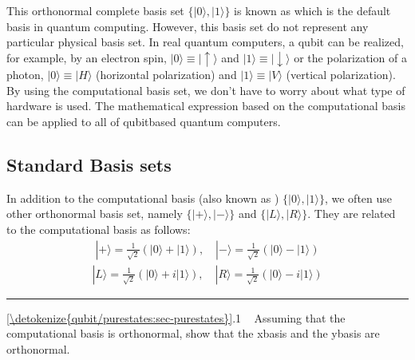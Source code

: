 \documentclass[letterpaper,10pt,english]{jupyterBook}
\begin{document}
\sphinxAtStartPar
This orthonormal complete basis set \(\{|0\rangle, |1\rangle\}\) is known as  which is the default basis in quantum computing.  However, this basis set do not represent any particular physical basis set.  In real quantum computers,  a qubit can be realized, for example, by an electron spin, \(|0\rangle \equiv | \uparrow \rangle\) and \(|1\rangle \equiv |\downarrow \rangle\) or the polarization of a photon, \(|0\rangle \equiv | H \rangle\) (horizontal polarization) and \(|1\rangle \equiv | V \rangle\) (vertical polarization).  By using the computational basis set, we don’t have to worry about what type of hardware is used.  The mathematical expression based on the computational basis can be applied to all of qubit\sphinxhyphen{}based quantum computers.


\subsection{Standard Basis sets}
\label{\detokenize{qubit/purestates:standard-basis-sets}}
\sphinxAtStartPar
In addition to the computational basis (also known as ) \(\{|0\rangle,|1\rangle\}\), we often use other orthonormal basis set, namely  \(\{|+\rangle, |-\rangle\}\) and  \(\{|L\rangle,|R\rangle\}\).
They are related to the computational basis as follows:
\begin{equation}\label{equation:qubit/purestates:XBasis}
\begin{split}
|+\rangle = \frac{1}{\sqrt{2}}\left(|0\rangle + |1\rangle\right), \quad
|-\rangle = \frac{1}{\sqrt{2}}\left(|0\rangle - |1\rangle\right)
\end{split}
\end{equation}\begin{equation}\label{equation:qubit/purestates:YBasis}
\begin{split}
|L\rangle = \frac{1}{\sqrt{2}}\left(|0\rangle + i |1\rangle\right), \quad
|R\rangle = \frac{1}{\sqrt{2}}\left(|0\rangle - i |1\rangle\right)
\end{split}
\end{equation}

\bigskip\hrule\bigskip


\sphinxAtStartPar
{} \hyperref[\detokenize{qubit/purestates:sec-purestates}]{\ref{\detokenize{qubit/purestates:sec-purestates}}}.1    Assuming that the computational basis is orthonormal, show that the x\sphinxhyphen{}basis and the y\sphinxhyphen{}basis are orthonormal.
\end{document}
